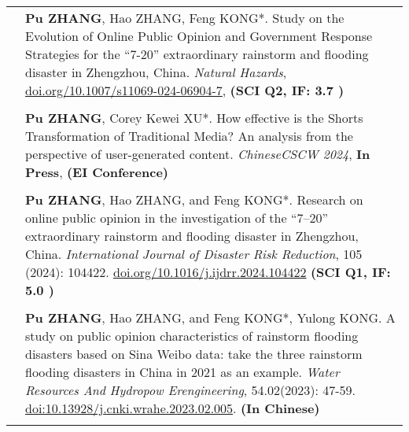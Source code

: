 \documentclass[letterpaper, 11pt]{article}
\begin{document}
\begin{longtable}{p{1.3in}p{4.8in}}

\nohyphens{\color{RoyalBlue}{Publications}} 

& \textbf{Pu ZHANG}, Hao ZHANG, Feng KONG*. Study on the Evolution of Online Public Opinion and Government Response Strategies for the “7-20” extraordinary rainstorm and flooding disaster in Zhengzhou, China. \textit{Natural Hazards}, \href{https://doi.org/10.1007/s11069-024-06904-7}{doi.org/10.1007/s11069-024-06904-7}, \bf(SCI Q2, IF: 3.7 )\\
& \\

& \textbf{Pu ZHANG}, Corey Kewei XU*. How effective is the Shorts Transformation of Traditional Media? An analysis from the perspective of user-generated content. \textit{ChineseCSCW 2024}, \textbf{ In Press}, \bf(EI Conference)\\
& \\

& \textbf{Pu ZHANG}, Hao ZHANG, and Feng KONG*. Research on online public opinion in the investigation of the “7–20” extraordinary rainstorm and flooding disaster in Zhengzhou, China. \textit{International Journal of Disaster Risk Reduction}, { 105 (2024): 104422.} \href{https://doi.org/10.1016/j.ijdrr.2024.104422}{doi.org/10.1016/j.ijdrr.2024.104422} \bf(SCI Q1, IF: 5.0 )\\

&\\
& \textbf{Pu ZHANG}, Hao ZHANG, and Feng KONG*, Yulong KONG. {A study on public opinion characteristics of rainstorm flooding disasters based on Sina Weibo data: take the three rainstorm flooding disasters in China in 2021 as an example}. \textit{Water Resources And Hydropow Erengineering}, {54.02(2023): 47-59}. \href{https://doi.org/10.13928/j.cnki.wrahe.2023.02.005}{doi:10.13928/j.cnki.wrahe.2023.02.005}. \bf(In Chinese)\\

&\\


\end{longtable}
\end{document}
